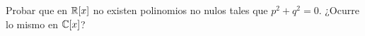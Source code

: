 \item Probar que en $\mathbb{R}[x]$ no existen polinomios no nulos tales que $p^2+q^2=0$. ¿Ocurre lo mismo en $\mathbb{C}[x]$?
    \begin{mdframed}[style=s]
        
    \end{mdframed}
